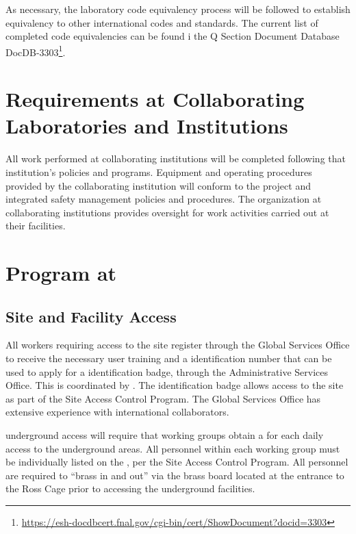 As necessary, the laboratory code equivalency process will be followed
to establish equivalency to other international codes and
standards. The current list of completed code equivalencies can be
found i  the Q Section Document Database DocDB-3303\footnote{\url{https://esh-docdbcert.fnal.gov/cgi-bin/cert/ShowDocument?docid=3303}}. 


\section{ Requirements at Collaborating Laboratories and Institutions}

All work performed at collaborating institutions will be completed
following that institution's  policies and
programs. Equipment and operating procedures provided by the
collaborating institution will conform to the  project
 and integrated safety management policies and
procedures. The  organization at collaborating institutions
provides  oversight for work activities carried
out at their facilities.

\section{  Program at }

\subsection{Site and Facility Access}

All  workers requiring access to the  site
register through the \fnal Global Services Office to receive the
necessary user training and a \fnal identification number that can be
used to apply for a  identification badge, through the
 Administrative Services Office. This is coordinated by
. The  identification badge allows access to
the  site as part of the  Site Access Control
Program. The \fnal Global Services Office has extensive experience
with international collaborators.


 underground access will require that working groups
obtain a  for each daily access to the
underground areas.  All personnel within each working group must be
individually listed on the , per the  Site
Access Control Program. All personnel are required to ``brass in and
out'' via the brass board located at the entrance to the Ross Cage prior to accessing the underground facilities.

